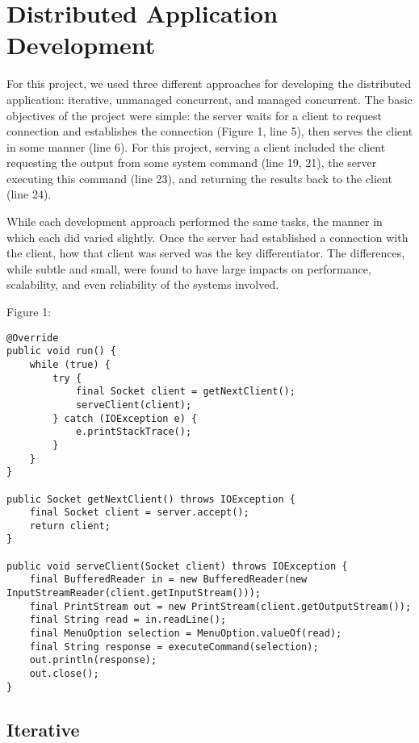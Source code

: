 \section{Distributed Application Development}

For this project, we used three different approaches for developing the distributed application: iterative, unmanaged concurrent, and managed concurrent. 
The basic objectives of the project were simple: the server waits for a client to request connection and establishes the connection (Figure 1, line 5), then serves the client in some manner (line 6). 
For this project, serving a client included the client requesting the output from some system command (line 19, 21), the server executing this command (line 23), and returning the results back to the client (line 24).

While each development approach performed the same tasks, the manner in which each did varied slightly. 
Once the server had established a connection with the client, how that client was served was the key differentiator.
The differences, while subtle and small, were found to have large impacts on performance, scalability, and even reliability of the systems involved.

Figure 1:
\begin{lstlisting}
@Override
public void run() {
	while (true) {
		try {
			final Socket client = getNextClient();
			serveClient(client);
		} catch (IOException e) {
			e.printStackTrace();
		}
	}
}

public Socket getNextClient() throws IOException {
	final Socket client = server.accept();
	return client;
}

public void serveClient(Socket client) throws IOException {
	final BufferedReader in = new BufferedReader(new InputStreamReader(client.getInputStream()));
	final PrintStream out = new PrintStream(client.getOutputStream());
	final String read = in.readLine();
	final MenuOption selection = MenuOption.valueOf(read);
	final String response = executeCommand(selection);
	out.println(response);
	out.close();
}
\end{lstlisting}

\subsection{Iterative}

